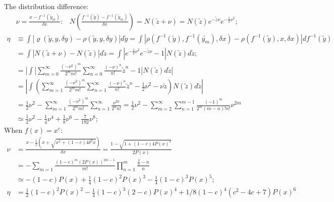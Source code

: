 \documentclass[twoside]{article}
\numberwithin{equation}{section}
\newcommand{\eqspace}{\;\;\;}
\begin{document}
The distribution difference:
\begin{align*}
&\nu = \frac{x - f^{-1}(\tilde{y}_m)}{\delta x}: \eqspace 
 N(\frac{f^{-1}(\tilde{y}) - f^{-1}(\tilde{y}_m)}{\delta x} )
 = N(\tilde{z} + \nu) = N(\tilde{z}) e^{-\tilde{z} \nu} e^{-\frac{1}{2} \nu^2}; \\
\eta &\equiv \int |\varrho(\tilde{y}, y, \delta y) - \rho(\tilde{y}, y, \delta y)| d \tilde{y}
 =  \int |\rho(f^{-1}(\tilde{y}), f^{-1}(\tilde{y_m}), \delta x) - \rho(f^{-1}(\tilde{y}), x, \delta x)| d f^{-1}(\tilde{y}) \\
&= \int |N(\tilde{z} + \nu) - N(\tilde{z})| d \tilde{z} 
 = \int |e^{-\frac{1}{2} \nu^2} e^{-\tilde{z} \nu} - 1| N(\tilde{z}) d \tilde{z}; \\
&= | \int |\sum_{m=0}^{\infty} \frac{(-\nu^2)^m}{2^m m!} \sum_{n=0}^{\infty} \frac{(-\nu)^n}{n!} \tilde{z}^n - 1| 
   N(\tilde{z}) d \tilde{z} | \\
&= | \int \left(\sum_{m=1}^{\infty} \frac{(-\nu^2)^m}{2^m m!} \sum_{n=1}^{\infty} \frac{(-\nu)^n}{n!} \tilde{z}^n
  - \frac{1}{2} \nu^2 - \nu \tilde{z} \right) N(\tilde{z}) d \tilde{z} | \\
&= \frac{1}{2} \nu^2 - \sum_{m=1}^{\infty} \frac{(-\nu^2)^m}{2^m m!} \sum_{n=1}^{\infty} \frac{\nu^{2n}}{2^n n!}
 = \frac{1}{2} \nu^2 - \sum_{m=2}^{\infty} \sum_{n=1}^{m-1} \frac{(-1)^m}{2^m (m - n)! n!} \nu^{2m} \\
&\simeq \frac{1}{2} \nu^2 - \frac{1}{4} \nu^4 + \frac{1}{8} \nu^6 - \frac{7}{192} \nu^8;
\end{align*}
When $f(x)=x^c$:
\begin{align*}
\nu &= \frac{x - \frac{1}{2} (x + \sqrt{x^2 + (1 - c) 4 \delta^2 x})}{\delta x} = \frac{1 - \sqrt{1 + (1 - c) 4 P(x)^2}}{2 P(x)} \\
&= - \sum_{m=1} \frac{(1 - c)^m (2P(x))^{2m - 1}}{m!} \prod_{n=1}^{m} \frac{\frac{3}{2} -n}{n} \\
&\simeq -(1 - c) P(x) + \frac{1}{4} (1 - c)^2 P(x)^3 - \frac{1}{4} (1 - c)^3 P(x)^5; \\
\eta &= \frac{1}{2} (1-c)^2 P(x)^2 - \frac{1}{4} (1-c)^3 (2-c) P(x)^4 + 1/8 (1-c)^4 (c^2-4c+7) P(x)^6
\end{align*}

\fi
\end{document}
